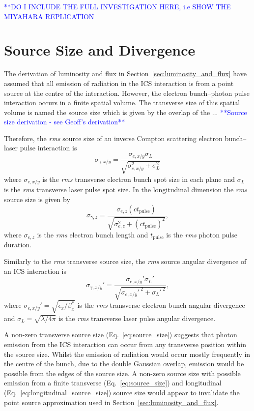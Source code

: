 \documentclass[../main.tex]{subfiles}
\begin{document}
\textcolor{blue}{**DO I INCLUDE THE FULL INVESTIGATION HERE, i.e SHOW THE MIYAHARA REPLICATION}

\section{Source Size and Divergence}

The derivation of luminosity and flux in Section~\ref{sec:luminosity_and_flux} have assumed that all emission of radiation in the ICS interaction is from a point source at the centre of the interaction. However, the electron bunch--photon pulse interaction occurs in a finite spatial volume. The transverse size of this spatial volume is named the source size which is given by the overlap of the ...
\textcolor{blue}{**Source size derivation - see Geoff's derivation**}

Therefore, the \textit{rms} source size of an inverse Compton scattering electron bunch--laser pulse interaction is 
\begin{equation}
\sigma_{\gamma,x/y} = \frac{\sigma_{e,x/y}\sigma_{L}}{\sqrt{\sigma_{e,x/y}^{2}+\sigma_{L}^{2}}}
\label{eq:source_size}
\end{equation}
where $\sigma_{e,x/y}$ is the \textit{rms} transverse electron bunch spot size in each plane and $\sigma_{L}$ is the \textit{rms} transverse laser pulse spot size. In the longitudinal dimension the \textit{rms} source size is given by
\begin{equation}
\sigma_{\gamma,z} = \frac{\sigma_{e,z}\left(ct_{\mathrm{pulse}}\right)}{\sqrt{\sigma_{e,z}^{2}+\left(ct_{\mathrm{pulse}}\right)^{2}}},
\label{eq:longitudinal_source_size}
\end{equation}
where $\sigma_{e,z}$ is the \textit{rms} electron bunch length and $t_{\mathrm{pulse}}$ is the \textit{rms} photon pulse duration. 

Similarly to the \textit{rms} transverse source size, the \textit{rms} source angular divergence of an ICS interaction is
\begin{equation}
\sigma_{\gamma,x/y}' = \frac{\sigma_{e,x/y}'\sigma_{L}'}{\sqrt{\sigma_{e,x/y}'^{~2}+\sigma_{L}'^{~2}}},
\label{eq:source_divergence}
\end{equation}
where $\sigma_{e,x/y}' = \sqrt{\epsilon_{x}/\beta_{x}^{*}}$ is the \textit{rms} transverse electron bunch angular divergence and $\sigma_{L} = \sqrt{\lambda/4\pi}$ is the \textit{rms} transverse laser pulse angular divergence.

A non-zero transverse source size (Eq.~\ref{eq:source_size}) suggests that photon emission from the ICS interaction can occur from any transverse position within the source size. Whilst the emission of radiation would occur mostly frequently in the centre of the bunch, due to the double Gaussian overlap, emission would be possible from the edges of the source size. A non-zero source size with possible emission from a finite transverse (Eq.~\ref{eq:source_size}) and longitudinal (Eq.~\ref{eq:longitudinal_source_size}) source size would appear to invalidate the point source approximation used in Section~\ref{sec:luminosity_and_flux}.
\end{document}
